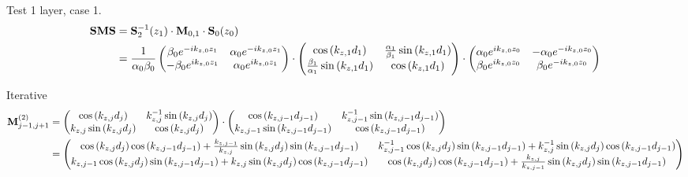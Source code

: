 Test 1 layer, case 1.
\begin{align*}
	\vb{SMS} &= \vb{S}_2^{-1}\pqty{z_1} \cdot \vb{M}_{0,1}\cdot{}\vb{S}_0\pqty{z_0} \\
	&= \frac{1}{\alpha_0\beta_0}\pmqty{
		\beta_0 e^{-ik_{z,0}z_1} & 
		\alpha_0 e^{-ik_{z,0}z_1} \\
		-\beta_0 e^{ik_{z,0}z_1} & 
		\alpha_0 e^{ik_{z,0}z_1}
		} \cdot \pmqty{
		\cos\pqty{k_{z,1}d_1} &
		\frac{\alpha_1}{\beta_1} \sin\pqty{k_{z,1}d_1} \\
		\frac{\beta_1}{\alpha_1} \sin\pqty{k_{z,1}d_1} &
		\cos\pqty{k_{z,1}d_1}
		} \cdot \pmqty{
		\alpha_0 e^{ik_{z,0}z_{0}} & 
		-\alpha_0 e^{-ik_{z,0}z_{0}} \\
		\beta_0 e^{ik_{z,0}z_{0}} & 
		\beta_0 e^{-ik_{z,0}z_{0}}
		}
\end{align*}


Iterative
\begin{align*}
	\vb{M}^{(2)}_{j-1,j+1} 
		&= \pmqty{
		\cos\pqty{k_{z,j}d_j} & 
		k_{z,j}^{-1}\sin\pqty{k_{z,j}d_j} \\
		k_{z,j}\sin\pqty{k_{z,j}d_j} &
		\cos\pqty{k_{z,j}d_j}
		} \cdot
		\pmqty{
		\cos\pqty{k_{z,j-1}d_{j-1}} & 
		k_{z,j-1}^{-1}\sin\pqty{k_{z,j-1}d_{j-1}} \\
		k_{z,j-1}\sin\pqty{k_{z,j-1}d_{j-1}} &
		\cos\pqty{k_{z,j-1}d_{j-1}}
		} \\
		&= \pmqty{
		\cos\pqty{k_{z,j}d_j}\cos\pqty{k_{z,j-1}d_{j-1}} + \frac{k_{z,j-1}}{k_{z,j}} \sin\pqty{k_{z,j}d_j}\sin\pqty{k_{z,j-1}d_{j-1}} & 
		k_{z,j-1}^{-1}\cos\pqty{k_{z,j}d_j}\sin\pqty{k_{z,j-1}d_{j-1}} + k_{z,j}^{-1}\sin\pqty{k_{z,j}d_j}\cos\pqty{k_{z,j-1}d_{j-1}} \\
		k_{z,j-1}     \cos\pqty{k_{z,j}d_j}\sin\pqty{k_{z,j-1}d_{j-1}} + k_{z,j}     \sin\pqty{k_{z,j}d_j}\cos\pqty{k_{z,j-1}d_{j-1}} &
		\cos\pqty{k_{z,j}d_j}\cos\pqty{k_{z,j-1}d_{j-1}} + \frac{k_{z,j}}{k_{z,j-1}} \sin\pqty{k_{z,j}d_j}\sin\pqty{k_{z,j-1}d_{j-1}}
		} 
\end{align*}

